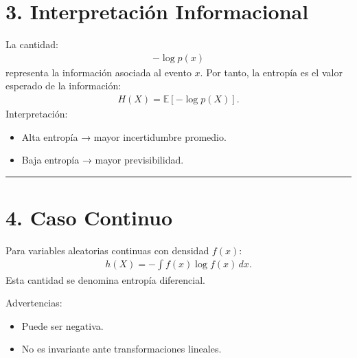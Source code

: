 \documentclass[letterpaper,10pt,english]{jupyterBook}
\begin{document}
\section{3. Interpretación Informacional}
\label{\detokenize{01_theory/entropy:interpretacion-informacional}}
\sphinxAtStartPar
La cantidad:
\begin{equation*}
\begin{split}
-\log p(x)
\end{split}
\end{equation*}
\sphinxAtStartPar
representa la información asociada al evento \(x\). Por tanto, la entropía es el valor esperado de la información:
\begin{equation*}
\begin{split}
H(X) = \mathbb{E}[-\log p(X)].
\end{split}
\end{equation*}
\sphinxAtStartPar
Interpretación:
\begin{itemize}
\item {} 
\sphinxAtStartPar
Alta entropía → mayor incertidumbre promedio.

\item {} 
\sphinxAtStartPar
Baja entropía → mayor previsibilidad.

\end{itemize}


\bigskip\hrule\bigskip



\section{4. Caso Continuo}
\label{\detokenize{01_theory/entropy:caso-continuo}}
\sphinxAtStartPar
Para variables aleatorias continuas con densidad \(f(x)\):
\begin{equation*}
\begin{split}
h(X) = -\int f(x)\log f(x)\,dx.
\end{split}
\end{equation*}
\sphinxAtStartPar
Esta cantidad se denomina entropía diferencial.

\sphinxAtStartPar
Advertencias:
\begin{itemize}
\item {} 
\sphinxAtStartPar
Puede ser negativa.

\item {} 
\sphinxAtStartPar
No es invariante ante transformaciones lineales.

\end{itemize}
\end{document}

